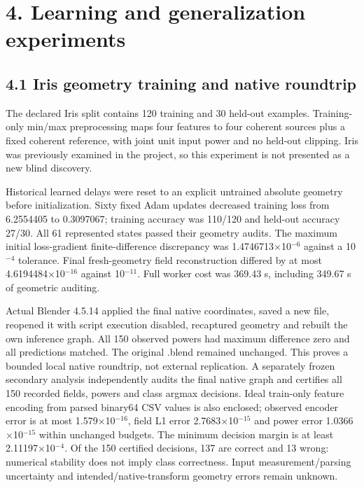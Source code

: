 \documentclass[11pt]{article}
\begin{document}
\section*{4. Learning and generalization experiments}

\subsection*{4.1 Iris geometry training and native roundtrip}

The declared Iris split contains 120 training and 30 held-out examples. Training-only min/max preprocessing maps four features to four coherent sources plus a fixed coherent reference, with joint unit input power and no held-out clipping. Iris was previously examined in the project, so this experiment is not presented as a new blind discovery.

Historical learned delays were reset to an explicit untrained absolute geometry before initialization. Sixty fixed Adam updates decreased training loss from 6.2554405 to 0.3097067; training accuracy was 110/120 and held-out accuracy 27/30. All 61 represented states passed their geometry audits. The maximum initial loss-gradient finite-difference discrepancy was 1.4746713$\times$10$^{-6}$ against a 10$^{-4}$ tolerance. Final fresh-geometry field reconstruction differed by at most 4.6194484$\times$10$^{-16}$ against 10$^{-11}$. Full worker cost was 369.43 s, including 349.67 s of geometric auditing.

Actual Blender 4.5.14 applied the final native coordinates, saved a new file, reopened it with script execution disabled, recaptured geometry and rebuilt the own inference graph. All 150 observed powers had maximum difference zero and all predictions matched. The original .blend remained unchanged. This proves a bounded local native roundtrip, not external replication. A separately frozen secondary analysis independently audits the final native graph and certifies all 150 recorded fields, powers and class argmax decisions. Ideal train-only feature encoding from parsed binary64 CSV values is also enclosed; observed encoder error is at most 1.579$\times$10$^{-16}$, field L1 error 2.7683$\times$10$^{-15}$ and power error 1.0366$\times$10$^{-15}$ within unchanged budgets. The minimum decision margin is at least 2.11197$\times$10$^{-4}$. Of the 150 certified decisions, 137 are correct and 13 wrong: numerical stability does not imply class correctness. Input measurement/parsing uncertainty and intended/native-transform geometry errors remain unknown.
\end{document}
